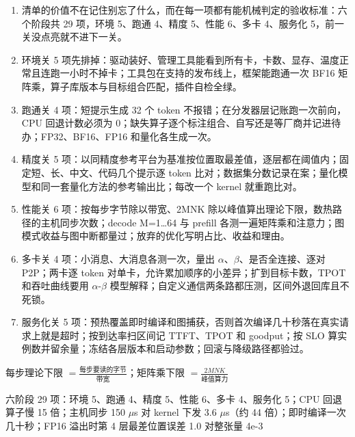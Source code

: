 \documentclass[UTF8,10.5pt,openany]{ctexbook}
\newcommand{\qlabel}[1]{{\sffamily\footnotesize\bfseries\color{accent}#1}\;}
\newcommand{\numline}[2]{\vspace{2pt}\noindent{\qlabel{#1}}%
  \begingroup\sloppy\raggedright{\sffamily\footnotesize\color{grayt}#2\par}\endgroup}
\begin{document}
\noindent{\qlabel{答}}\begingroup\sloppy\begin{enumerate}[leftmargin=1.6em,itemsep=2.5pt,topsep=0pt,parsep=0pt,label={\sffamily\footnotesize\color{accent}\arabic*.}]
\item {\fontsize{10}{14.8}\selectfont 清单的价值不在记住别忘了什么，而在每一项都有能机械判定的验收标准：六个阶段共 29 项，环境 5、跑通 4、精度 5、性能 6、多卡 4、服务化 5，前一关没点亮就不进下一关。\par}
\item {\fontsize{10}{14.8}\selectfont 环境关 5 项先排掉：驱动装好、管理工具能看到所有卡，卡数、显存、温度正常且连跑一小时不掉卡；工具包在支持的发布线上，框架能跑通一次 BF16 矩阵乘，算子库版本与目标组合匹配，插件自检全绿。\par}
\item {\fontsize{10}{14.8}\selectfont 跑通关 4 项：短提示生成 32 个 token 不报错；在分发器层记账跑一次前向，CPU 回退计数必须为 0；缺失算子逐个标注组合、自写还是等厂商并记进待办；FP32、BF16、FP16 和量化各生成一次。\par}
\item {\fontsize{10}{14.8}\selectfont 精度关 5 项：以同精度参考平台为基准按位置取最差值，逐层都在阈值内；固定短、长、中文、代码几个提示逐 token 比对；数据集分数记录在案；量化模型和同一套量化方法的参考输出比；每改一个 kernel 就重跑比对。\par}
\item {\fontsize{10}{14.8}\selectfont 性能关 6 项：按每步字节除以带宽、2MNK 除以峰值算出理论下限，数热路径的主机同步次数；decode M=1…64 与 prefill 各测一遍矩阵乘和注意力；图模式收益与图中断都量过；放弃的优化写明占比、收益和理由。\par}
\item {\fontsize{10}{14.8}\selectfont 多卡关 4 项：小消息、大消息各测一次，量出 $\alpha$、$\beta$、是否全连接、逐对 P2P；两卡逐 token 对单卡，允许累加顺序的小差异；扩到目标卡数，TPOT 和吞吐曲线要用 $\alpha$-$\beta$ 模型解释；自定义通信两条路都压测，区间外退回库且不死锁。\par}
\item {\fontsize{10}{14.8}\selectfont 服务化关 5 项：预热覆盖即时编译和图捕获，否则首次编译几十秒落在真实请求上就是超时；按到达率扫区间记 TTFT、TPOT 和 goodput；按 SLO 算实例数并留余量；冻结各层版本和启动参数；回滚与降级路径都验过。\par}
\end{enumerate}\endgroup
\numline{公式}{每步理论下限 $=\frac{\text{每步要读的字节}}{\text{带宽}}$；矩阵乘下限 $=\frac{2MNK}{\text{峰值算力}}$}
\numline{数字}{六阶段 29 项：环境 5、跑通 4、精度 5、性能 6、多卡 4、服务化 5；CPU 回退算子慢 15 倍；主机同步 150 $\mu$s 对 kernel 下发 3.6 $\mu$s（约 44 倍）；即时编译一次几十秒；FP16 溢出时第 4 层最差位置误差 1.0 对整张量 4e-3}
\end{document}
